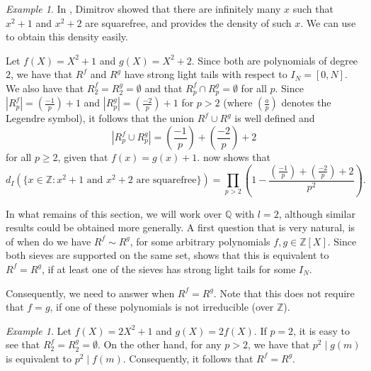 \documentclass[a4paper,11pt,reqno]{amsart}
\theoremstyle{plain}
\theoremstyle{remark}
\newtheorem{example}[theorem]{Example}
\newcommand{\q}{\mathbb{Q}}
\newcommand{\z}{\mathbb{Z}}
\begin{document}
				\begin{example}
					\label{ex: Dimitrov}
					In \cite{Dimitrov1}, Dimitrov showed that there are infinitely many $x$ such that $x^2+1$ and $x^2+2$ are squarefree, and provides the density of such $x$. We can use  to obtain this density easily. 
					
					Let $f(X) = X^2+1$ and $g(X) = X^2+2$. Since both are polynomials of degree $2$, we have that $R^f$ and $R^g$ have strong light tails with respect to $I_N = [0,N]$. We also have that $R^f_2 = R^g_2 = \emptyset$ and that $R_p^f \cap R_p^g = \emptyset$ for all $p$. Since $|R^f_p| = \left(\frac{-1}{p}\right)+1$ and $|R^g_p| = \left(\frac{-2}{p}\right)+1$ for $p> 2$ (where $\left(\frac{a}{p}\right)$ denotes the Legendre symbol), it follows that the union $R^f \cup R^g$ is well defined and  $$|R_p^f \cup R_p^g| = \left(\frac{-1}{p}\right)+\left(\frac{-2}{p}\right)+2$$ for all $p \geq 2$, given that $f(x) = g(x)+1$.  now shows that
					$$d_I\left(\{x \in \z: x^2+1 \text{ and } x^2+2 \text{ are squarefree} \}\right) =\prod_{p>2} \left(1-\frac{\left(\frac{-1}{p}\right)+ \left(\frac{-2}{p}\right)+2 }{p^2}\right).$$
					
				\end{example}
				
				
				
				In what remains of this section, we will work over $\q$ with $l =2$, although similar results could be obtained more generally. A first question that is very natural, is of when do we have $R^f \sim R^g$, for some arbitrary polynomials $f,g \in \z[X]$. Since both sieves are supported on the same set,  shows that this is equivalent to $R^f = R^g$, if at least one of the sieves has strong light tails for some $I_N$.
				
				Consequently, we need to answer when $R^f = R^g$. Note that this does not require that $f = g$, if one of these polynomials is not irreducible (over $\z$).
				
				\begin{example}
					Let $f(X) = 2X^2+1$ and $g(X) = 2f(X)$. If $p=2$, it is easy to see that $R^f_2 = R^g_2 = \emptyset$. On the other hand, for any $p>2$, we have that $p^2\mid g(m)$ is equivalent to $p^2\mid f(m)$. Consequently, it follows that $R^f = R^g$.
				\end{example}
				
\end{document}
